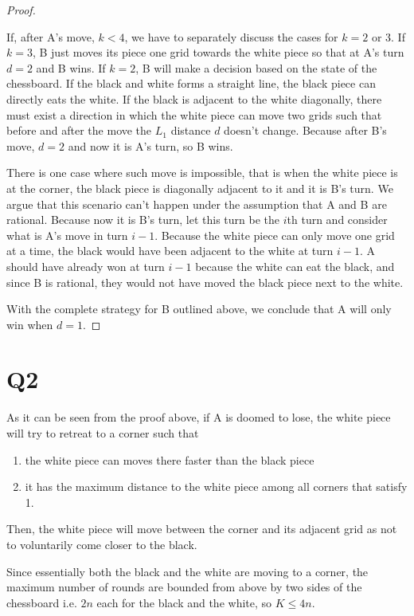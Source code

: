 \documentclass[a4paper]{article}
\begin{document}
\begin{proof}
\begin{itemize}
        If, after A's move, $k < 4$, we have to separately discuss the cases for
        $k = 2$ or 3. If $k = 3$, B just moves its piece one grid towards the
        white piece so that at A's turn $d = 2$ and B wins. If $k = 2$, B will
        make a decision based on the state of the chessboard. If the black and
        white forms a straight line, the black piece can directly eats the
        white. If the black is adjacent to the white diagonally, there must
        exist a direction in which the white piece can move two grids such that
        before and after the move the $L_1$ distance $d$ doesn't change. Because
        after B's move, $d = 2$ and now it is A's turn, so B wins.

        There is one case where such move is impossible, that is when the white
        piece is at the corner, the black piece is diagonally adjacent to it and
        it is B's turn. We argue that this scenario can't happen under the
        assumption that A and B are rational. Because now it is B's turn, let
        this turn be the $i$th turn and consider what is A's move in turn $i -
        1$. Because the white piece can only move one grid at a time, the black
        would have been adjacent to the white at turn $i - 1$. A should have
        already won at turn $i - 1$ because the white can eat the black, and
        since B is rational, they would not have moved the black piece next to
        the white.
    \end{itemize}
    With the complete strategy for B outlined above, we conclude that A will
    only win when $d = 1$.
\end{proof}

\section*{Q2}

As it can be seen from the proof above, if A is doomed to lose, the white piece
will try to retreat to a corner such that
\begin{enumerate}
    \item the white piece can moves there faster than the black piece
    \item it has the maximum distance to the white piece among all corners that
    satisfy 1.
\end{enumerate}

Then, the white piece will move between the corner and its adjacent grid as not
to voluntarily come closer to the black.

Since essentially both the black and the white are moving to a corner, the
maximum number of rounds are bounded from above by two sides of the chessboard
i.e. $2n$ each for the black and the white, so $K \leq 4n$.
\end{document}
